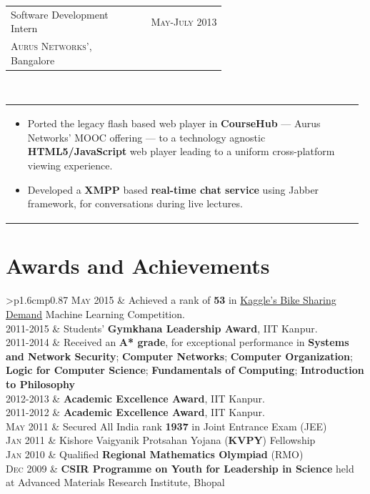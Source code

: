 \documentclass[a4paper]{article} %
\newcommand{\verticalspacing}{-0.25cm}
\newcommand{\bulletspace}{0.7cm}
\newcommand{\projectheadspacing}{6.9cm}
\newcommand{\cproject}[5]{%
    \begin{tabular}{p{0.60\linewidth}r}
        \textcolor{NavyBlue}{\small #2} & \multicolumn{1}{m{ \projectheadspacing{} }}{\raggedleft \small {\textsc{#1}}}\\
        \small {#3} & \small {#4}
    \end{tabular}\\
    \begin{tabular}{p{0.98\linewidth}}
    \vspace{-0.3cm}
        \small{#5}
    \end{tabular}
    \vspace{\verticalspacing{}}
}
\newcommand{\itemlist}[1]{%
    \def\arraystretch{1.2}
    \begin{tabular}{>{\raggedleft}p{1.6cm}p{0.87\linewidth}}
        #1
    \end{tabular}
    \def\arraystretch{1.0}
}
\begin{document}
\cproject
    {May-July 2013}
    {Software Development Intern}
    {\textsc{Aurus Networks'}, Bangalore}
    {}
    {%
        \begin{itemize}[leftmargin=\bulletspace{}]
            \item Ported the legacy flash based web player in \textbf{CourseHub} --- Aurus Networks'
                MOOC offering --- to a technology agnostic \textbf{HTML5/JavaScript} web player leading
                to a uniform cross-platform viewing experience.
            \item Developed a \textbf{XMPP} based \textbf{real-time chat service} using Jabber framework,
                for conversations during live lectures.
        \end{itemize}
    }

\section{Awards and Achievements}

\itemlist {%
    \textsc{\small May 2015}    & Achieved a rank of \textbf{53} in
                                  \href{https://www.kaggle.com/c/bike-sharing-demand/leaderboard}
                                  {Kaggle's Bike Sharing Demand} Machine Learning Competition. \\
    \textsc{\small 2011-2015}   & Students' \textbf{Gymkhana Leadership Award}, IIT Kanpur. \\
    \textsc{\small 2011-2014}   & Received an \textbf{A* grade}, for exceptional performance in
                                    \textbf{Systems and Network Security};
                                    \textbf{Computer Networks};
                                    \textbf{Computer Organization};
                                    \textbf{Logic for Computer Science};
                                    \textbf{Fundamentals of Computing};
                                    \textbf{Introduction to Philosophy} \\
    \textsc{\small 2012-2013}   & \textbf{Academic Excellence Award}, IIT Kanpur. \\
    \textsc{\small 2011-2012}   & \textbf{Academic Excellence Award}, IIT Kanpur. \\
    \textsc{\small May 2011}    & Secured All India rank \textbf{1937} in Joint Entrance Exam (JEE) \\
    \textsc{\small Jan 2011}    & Kishore Vaigyanik Protsahan Yojana (\textbf{KVPY}) Fellowship \\
    \textsc{\small Jan 2010}    & Qualified \textbf{Regional Mathematics Olympiad} (RMO) \\
    \textsc{\small Dec 2009}    & \textbf{CSIR Programme on Youth for Leadership in Science} held at
                                  Advanced Materials Research Institute, Bhopal\\
}
\end{document}
